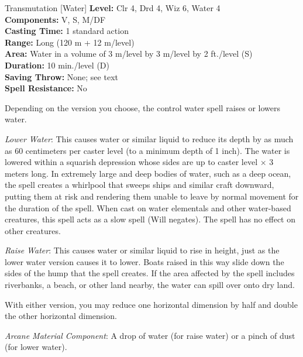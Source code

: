 {Transmutation [Water]}
{
	\textbf{Level:}
	Clr 4, Drd 4, Wiz 6, Water 4\\
	\textbf{Components:}
	V, S, M/DF\\
	\textbf{Casting Time:}
	1 standard action\\
	\textbf{Range:}
	Long (120 m + 12 m/level)\\
	\textbf{Area:}
	Water in a volume of 3 m/level by 3 m/level by 2 ft./level (S)\\
	\textbf{Duration:}
	10 min./level (D)\\
	\textbf{Saving Throw:}
	None; see text\\
	\textbf{Spell Resistance:}
	No\\
}
{
	Depending on the version you choose, the control water spell raises or lowers water.

	\textit{Lower Water}:
	This causes water or similar liquid to reduce its depth by as much as 60 centimeters per caster level (to a minimum depth of 1 inch). The water is lowered within a squarish depression whose sides are up to caster level $\times$ 3 meters long. In extremely large and deep bodies of water, such as a deep ocean, the spell creates a whirlpool that sweeps ships and similar craft downward, putting them at risk and rendering them unable to leave by normal movement for the duration of the spell. When cast on water elementals and other water-based creatures, this spell acts as a slow spell (Will negates). The spell has no effect on other creatures.

	\textit{Raise Water}:
	This causes water or similar liquid to rise in height, just as the lower water version causes it to lower. Boats raised in this way slide down the sides of the hump that the spell creates. If the area affected by the spell includes riverbanks, a beach, or other land nearby, the water can spill over onto dry land.

	With either version, you may reduce one horizontal dimension by half and double the other horizontal dimension.

	\textit{Arcane Material Component}:
	A drop of water (for raise water) or a pinch of dust (for lower water).

}
